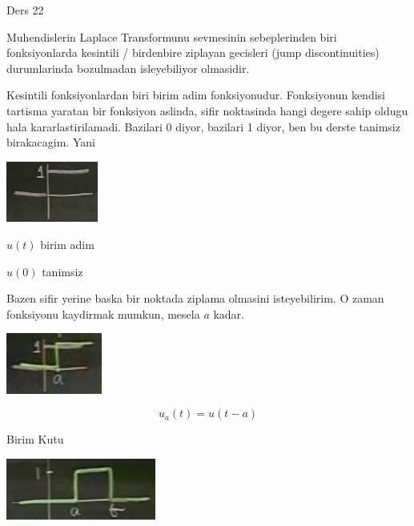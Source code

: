 \documentclass[12pt,fleqn]{article}
\begin{document}
Ders 22

Muhendislerin Laplace Transformunu sevmesinin sebeplerinden biri
fonksiyonlarda kesintili / birdenbire ziplayan gecisleri (jump
discontinuities) durumlarinda bozulmadan isleyebiliyor olmasidir. 

Kesintili fonksiyonlardan biri birim adim fonksiyonudur. Fonksiyonun
kendisi tartisma yaratan bir fonksiyon aslinda, sifir noktasinda hangi
degere sahip oldugu hala kararlastirilamadi. Bazilari 0 diyor, bazilari 1
diyor, ben bu derste tanimsiz birakacagim. Yani

\includegraphics[height=2cm]{22_1.png}

$u(t)$ birim adim

$u(0)$ tanimsiz

Bazen sifir yerine baska bir noktada ziplama olmasini isteyebilirim. O
zaman fonksiyonu kaydirmak mumkun, mesela $a$ kadar. 

\includegraphics[height=2cm]{22_2.png}

\[ u_a(t) = u(t-a) \]

Birim Kutu

\includegraphics[height=2cm]{22_3.png}
\end{document}
